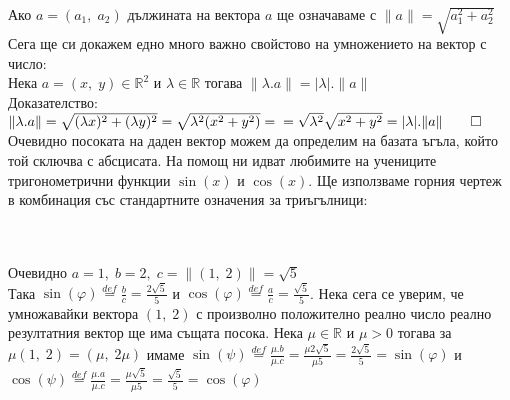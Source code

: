 \documentclass[12pt]{article}
\newcommand{\R}{\mathbb{R}}
\begin{document}
Ако $a = (a_1, \; a_2)$ дължината на вектора $a$ ще означаваме с $\|a\| = \sqrt{a_1^2 + a_2^2}$ \\

Сега ще си докажем едно много важно свойстово на умножението на вектор с число: \\

Нека $a = (x, \; y) \in \R^2$ и $\lambda \in \R$ тогава $\|\lambda . a\| = |\lambda|.\|a\|$ \\

Доказателство: $\|\lambda . a\| = \sqrt{(\lambda x)^2 + (\lambda y)^2} = \sqrt{\lambda^2(x^2 + y^2)} = \\
= \sqrt{\lambda^2}\sqrt{x^2 + y^2} = |\lambda|.\|a\| \qed$ \\

Очевидно посоката на даден вектор можем да определим на базата ъгъла, който той сключва с абсцисата.
На помощ ни идват любимите на учениците тригонометрични функции $\sin(x)$ и $\cos(x)$.
Ще използваме горния чертеж в комбинация със стандартните означения за триъгълници: \\

 \\\\

Очевидно $a = 1, \; b = 2, \; c = \|(1, \; 2)\| = \sqrt{5}$ \\

Така $ \sin(\varphi) \overset{def}{=} \frac{b}{c} = \frac{2\sqrt{5}}{5} $ и $ \cos(\varphi) \overset{def}{=} \frac{a}{c} = \frac{\sqrt{5}}{5} $. Нека сега се уверим,
че умножавайки вектора $(1, \; 2)$ с произволно положително реално число реално резултатния вектор ще има същата посока.
Нека $\mu \in \R$ и $\mu > 0$ тогава за $\mu(1, \; 2) = (\mu, \; 2\mu) $ имаме
$ \sin(\psi) \overset{def}{=} \frac{\mu.b}{\mu.c} = \frac{\mu2\sqrt{5}}{\mu5} = \frac{2\sqrt{5}}{5} = \sin(\varphi) $
и $ \cos(\psi) \overset{def}{=} \frac{\mu.a}{\mu.c} = \frac{\mu\sqrt{5}}{\mu5} = \frac{\sqrt{5}}{5} = \cos(\varphi) $
\end{document}
